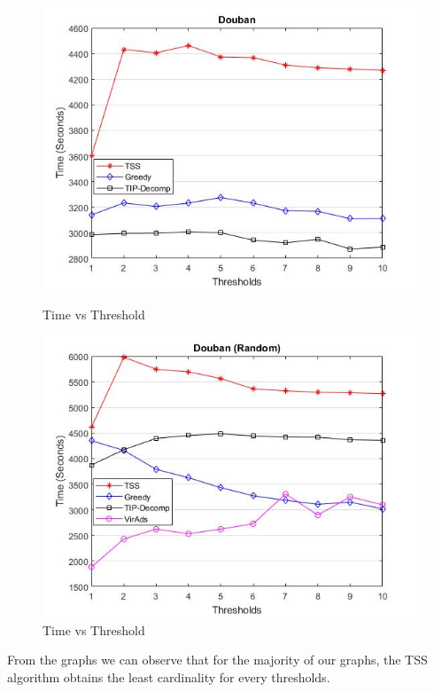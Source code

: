 \begin{figure}[h!]
\begin{minipage}[t]{0.50\textwidth}
\includegraphics[width=\linewidth,keepaspectratio=true]{images/doubantime.jpg}
\caption{Time vs Threshold}

\end{minipage}
\begin{minipage}[t]{0.50\textwidth}
\includegraphics[width=\linewidth,keepaspectratio=true]{images/doubantimerandom.jpg}
\caption{Time vs Threshold}
\end{minipage}
\end{figure}

From the graphs we can observe that for the majority of our graphs, the TSS algorithm obtains the least cardinality for every thresholds.

